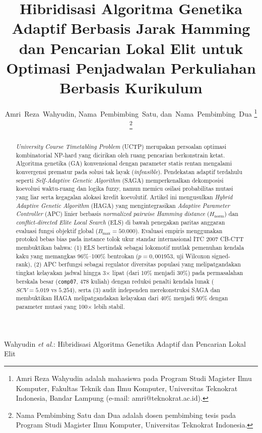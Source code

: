 \documentclass[journal]{IEEEtran}
\begin{document}
\title{Hibridisasi Algoritma Genetika Adaptif Berbasis Jarak Hamming dan Pencarian Lokal Elit untuk Optimasi Penjadwalan Perkuliahan Berbasis Kurikulum}

\author{Amri~Reza~Wahyudin,
        Nama~Pembimbing~Satu,
        dan~Nama~Pembimbing~Dua%
\thanks{Amri Reza Wahyudin adalah mahasiswa pada Program Studi Magister Ilmu Komputer, Fakultas Teknik dan Ilmu Komputer, Universitas Teknokrat Indonesia, Bandar Lampung (e-mail: amri@teknokrat.ac.id).}%
\thanks{Nama Pembimbing Satu dan Dua adalah dosen pembimbing tesis pada Program Studi Magister Ilmu Komputer, Universitas Teknokrat Indonesia.}%
}

%
{Wahyudin \MakeLowercase{\textit{et al.}}: Hibridisasi Algoritma Genetika Adaptif dan Pencarian Lokal Elit}

\maketitle

\begin{abstract}
\textit{University Course Timetabling Problem} (UCTP) merupakan persoalan optimasi kombinatorial NP-hard yang dicirikan oleh ruang pencarian berkonstrain ketat. Algoritma genetika (GA) konvensional dengan parameter statis rentan mengalami konvergensi prematur pada solusi tak layak (\textit{infeasible}). Pendekatan adaptif terdahulu seperti \textit{Self-Adaptive Genetic Algorithm} (SAGA) memperkenalkan dekomposisi koevolusi waktu-ruang dan logika fuzzy, namun memicu osilasi probabilitas mutasi yang liar serta kegagalan alokasi kredit koevolutif. Artikel ini mengusulkan \textit{Hybrid Adaptive Genetic Algorithm} (HAGA) yang mengintegrasikan \textit{Adaptive Parameter Controller} (APC) linier berbasis \textit{normalized pairwise Hamming distance} ($H_{\text{norm}}$) dan \textit{conflict-directed Elite Local Search} (ELS) di bawah penegakan paritas anggaran evaluasi fungsi objektif global ($B_{\max} = 50.000$). Evaluasi empiris menggunakan protokol bebas bias pada instance tolok ukur standar internasional ITC 2007 CB-CTT membuktikan bahwa: (1) ELS bertindak sebagai lokomotif mutlak pemenuhan kendala kaku yang memangkas 96\%--100\% bentrokan ($p = 0{,}001953$, uji Wilcoxon signed-rank), (2) APC berfungsi sebagai regulator diversitas populasi yang melipatgandakan tingkat kelayakan jadwal hingga 3$\times$ lipat (dari 10\% menjadi 30\%) pada permasalahan berskala besar (\texttt{comp07}, 478 kuliah) dengan reduksi penalti kendala lunak ($SCV = 5.019$ vs $5.254$), serta (3) audit independen merekonstruksi SAGA dan membuktikan HAGA melipatgandakan kelayakan dari 40\% menjadi 90\% dengan parameter mutasi yang 100$\times$ lebih stabil.
\end{abstract}
\end{document}
